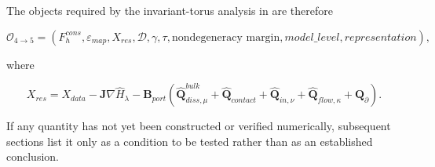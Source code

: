The objects required by the invariant-torus analysis in  are therefore

\begin{equation}
\label{eq:chnn-4-62}
\mathcal{O}_{4 \rightarrow 5}=\left(F_{h}^{cons},\varepsilon_{map},X_{res},\mathcal{D},\gamma,\tau,\text{nondegeneracy margin},model\_level,representation\right),
\end{equation}

where

\begin{equation}
\label{eq:chnn-4-63}
\boxed{X_{res} = X_{data} - \mathbf{J}\nabla{\widehat{H}}_{\lambda} - \mathbf{B}_{port}\left( {\widehat{\mathbf{Q}}}_{diss,\mu}^{bulk} + {\widehat{\mathbf{Q}}}_{contact} + {\widehat{\mathbf{Q}}}_{in,\nu} + {\widehat{\mathbf{Q}}}_{flow,\kappa} + \mathbf{Q}_{\partial} \right).}
\end{equation}

If any quantity has not yet been constructed or verified numerically, subsequent sections list it only as a condition to be tested rather than as an established conclusion.
